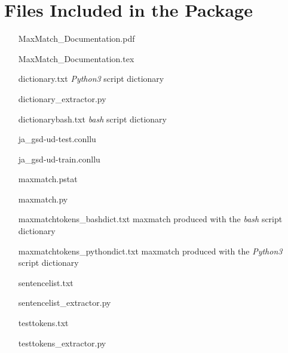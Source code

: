 \documentclass{hitec}
\begin{document}
	\section{Files Included in the Package}
	\begin{itemize}
	\item [MaxMatch\_Documentation.pdf]                           
	\item [MaxMatch\_Documentation.tex]         
	\item [dictionary.txt] \textit{Python3} script dictionary                
	\item [dictionary\_extractor.py]              
	\item [dictionarybash.txt] \textit{bash} script dictionary
	\item [ja\_gsd-ud-test.conllu]
	\item [ja\_gsd-ud-train.conllu]
	\item [maxmatch.pstat]
	\item [maxmatch.py]
	\item [maxmatchtokens\_bashdict.txt] maxmatch produced with the \textit{bash} script dictionary
	\item [maxmatchtokens\_pythondict.txt] maxmatch produced with the \textit{Python3} script dictionary 
	\item [sentencelist.txt]
	\item [sentencelist\_extractor.py]
	\item [testtokens.txt]
	\item [testtokens\_extractor.py]
	\end{itemize}
\end{document}
